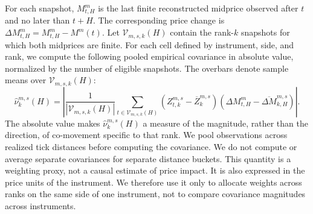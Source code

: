 \documentclass[11pt]{article}
\newenvironment{review}{\begingroup\color{blue}}{\endgroup}
\begin{document}
For each snapshot, $M^m_{t,H}$ is the last finite reconstructed midprice observed after $t$ and no later than $t+H$.
The corresponding price change is $\Delta M^m_{t,H}=M^m_{t,H}-M^m(t)$. Let $\mathcal{V}_{m,s,k}(H)$ contain the rank-$k$
snapshots for which both midprices are finite. For \begin{review}each cell defined by instrument, side, and rank\end{review}, we compute the following pooled
empirical covariance in absolute value, normalized by the number of eligible snapshots. The overbars denote sample means over
$\mathcal{V}_{m,s,k}(H)$:
\begin{equation}
    \widehat\nu^{m,s}_{k}(H)
    =
    \left|
        \frac{1}{|\mathcal{V}_{m,s,k}(H)|}
        \sum_{t\in\mathcal{V}_{m,s,k}(H)}
        \left(Z^{m,s}_{t,k}-\overline Z^{m,s}_{k}\right)
        \left(\Delta M^m_{t,H}-\overline{\Delta M}^{m,s}_{k,H}\right)
    \right|.
    \label{eq:empirical_visibility_covariance}
\end{equation}
The absolute value makes $\widehat\nu^{m,s}_{k}(H)$ a measure of the magnitude, rather than the direction, of
\begin{review}co-movement specific to that rank\end{review}. We pool observations across realized tick distances before computing the covariance. We do not
compute or average separate \begin{review}covariances for separate distance buckets\end{review}. This quantity is a weighting proxy, not a causal estimate of price
impact. It is also expressed in \begin{review}the price units of the instrument\end{review}. We therefore use it only to allocate weights across
ranks on the same side of one instrument, not to compare covariance magnitudes across instruments.
\end{document}
